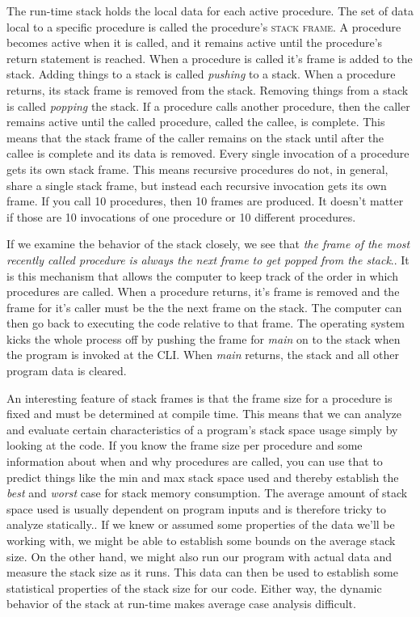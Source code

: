 \documentclass[]{tufte-handout}
\begin{document}
The run-time stack holds the local data for each active procedure. The set of data local to a specific procedure is called the procedure's \textsc{stack frame.}  A procedure becomes active when it is called, and it remains active until the procedure's return statement is reached. When a procedure is called it's frame is added to the stack. Adding things to a stack is called \textit{pushing} to a stack. When a procedure returns, its stack frame is removed from the stack. Removing things from a stack is called \textit{popping} the stack. If a procedure calls another procedure, then the caller remains active until the called procedure, called the callee, is complete.  This means that the stack frame of the caller remains on the stack until after the callee is complete and its data is removed.  Every single invocation of a procedure gets its own stack frame. This means recursive procedures do not, in general, share a single stack frame, but instead each recursive invocation gets its own frame.  If you call 10 procedures, then 10 frames are produced. It doesn't matter if those are 10 invocations of one procedure or 10 different procedures. 

If we examine the behavior of the stack closely, we see that \textit{the frame of the most recently called procedure is always the next frame to get popped from the stack}..  It is this mechanism that allows the computer to keep track of the order in which procedures are called.  When a procedure returns, it's frame is removed and the frame for it's caller must be the the next frame on the stack.  The computer can then go back to executing the code relative to that frame. The operating system kicks the whole process off by pushing the frame for \textit{main} on to the stack when the program is invoked at the CLI. When \textit{main} returns, the stack and all other program data is cleared.

An interesting feature of stack frames is that the frame size for a procedure is fixed and must be determined at compile time. This means that we can analyze and evaluate certain characteristics of a program's stack space usage simply by looking at the code. If you know the frame size per procedure and some information about when and why procedures are called, you can use that to predict things like the min and max stack space used and thereby establish the \textit{best} and \textit{worst} case for stack memory consumption. The average amount of stack space used is usually dependent on program inputs and is therefore tricky to analyze statically.. If we knew or assumed some properties of the data we'll be working with, we might be able to establish some bounds on the average stack size. On the other hand, we might also run our program with actual data and measure the stack size as it runs. This data can then be used to establish some statistical properties of the stack size for our code. Either way, the dynamic behavior of the stack at run-time makes average case analysis difficult.
\end{document}
